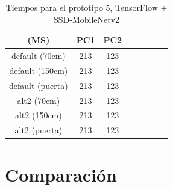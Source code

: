 \begin{table}[h!]
	\begin{center}
		\begin{tabular}{ |c|c|c|c|c|c|c|c| } 
			\hline
			(MS) & PC1 & PC2 \\
			\hline
			default (70cm) & 213  & 123  \\
			\hline
			default (150cm) & 213  & 123 \\
			\hline
			default (puerta) & 213  & 123 \\
			\hline
			alt2 (70cm) & 213  & 123  \\
			\hline
			alt2 (150cm) & 213  & 123 \\
			\hline
			alt2 (puerta) & 213  & 123 \\
			\hline
		\end{tabular}
		\caption{Tiempos para el prototipo 5, TensorFlow + SSD-MobileNetv2}
		\label{tab:table6}
	\end{center}
\end{table}






\newpage
\section{Comparación}